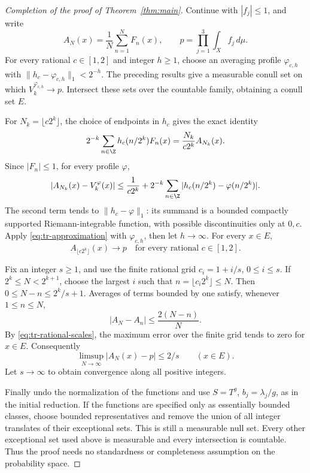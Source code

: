 \begin{proof}[Completion of the proof of Theorem~\ref{thm:main}]
Continue with \(|f_j|\leq1\), and write
\[
 A_N(x)=\frac1N\sum_{n=1}^NF_n(x),
 \qquad p=\prod_{j=1}^3\int_Xf_j\,d\mu.
\]
For every rational \(c\in[1,2]\) and integer \(h\geq1\), choose
an averaging profile \(\varphi_{c,h}\) with
\(\|h_c-\varphi_{c,h}\|_1<2^{-h}\).  The preceding results give
a measurable conull set on which \(V_k^{\varphi_{c,h}}\to p\).
Intersect these sets over the countable family, obtaining a conull
set \(E\).

For \(N_k=\lfloor c2^k\rfloor\), the choice of endpoints in
\(h_c\) gives the exact identity
\[
 2^{-k}\sum_{n\in\Z}h_c(n/2^k)F_n(x)
 =\frac{N_k}{c2^k}A_{N_k}(x).
\]
Since \(|F_n|\leq1\), for every profile \(\varphi\),
\begin{equation}
 |A_{N_k}(x)-V_k^\varphi(x)|
 \leq\frac1{c2^k}
      +2^{-k}\sum_{n\in\Z}|h_c(n/2^k)-\varphi(n/2^k)|.
 \label{eq:tr-approximation}
\end{equation}
The second term tends to \(\|h_c-\varphi\|_1\): its summand is
a bounded compactly supported Riemann-integrable function, with
possible discontinuities only at \(0,c\).  Apply
\eqref{eq:tr-approximation} with \(\varphi_{c,h}\), then let
\(h\to\infty\).  For every \(x\in E\),
\begin{equation}
 A_{\lfloor c2^k\rfloor}(x)\longrightarrow p
 \quad\text{for every rational }c\in[1,2].
 \label{eq:tr-rational-scales}
\end{equation}

Fix an integer \(s\geq1\), and use the finite rational grid
\(c_i=1+i/s\), \(0\leq i\leq s\).  If
\(2^k\leq N<2^{k+1}\), choose the largest \(i\) such that
\(n=\lfloor c_i2^k\rfloor\leq N\).  Then
\(0\leq N-n\leq2^k/s+1\).  Averages of terms bounded by one
satisfy, whenever \(1\leq n\leq N\),
\[
 |A_N-A_n|\leq\frac{2(N-n)}{N}.
\]
By \eqref{eq:tr-rational-scales}, the maximum error over the finite
grid tends to zero for \(x\in E\).  Consequently
\[
 \limsup_{N\to\infty}|A_N(x)-p|\leq2/s\qquad(x\in E).
\]
Let \(s\to\infty\) to obtain convergence along all positive integers.

Finally undo the normalization of the functions and use
\(S=T^g\), \(b_j=\lambda_j/g\), as in the initial reduction.
If the functions are specified only as essentially bounded classes,
choose bounded representatives and remove the union of all integer
translates of their exceptional sets.  This is still a measurable
null set.  Every other exceptional set used above is measurable and
every intersection is countable.  Thus the proof needs no standardness
or completeness assumption on the probability space.
\end{proof}

